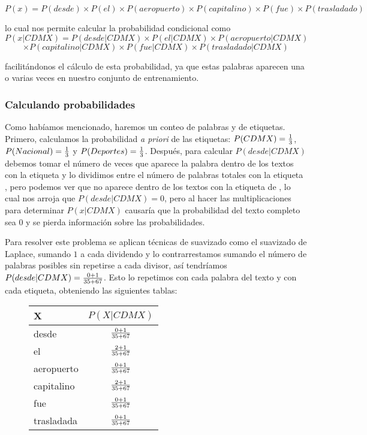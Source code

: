 \[ P(x) = P(desde) \times P(el) \times P(aeropuerto) \times P(capitalino) \times P(fue) \times P(trasladado) \]

lo cual nos permite calcular la probabilidad condicional como
\[ P(x | CDMX) = P(desde|CDMX) \times P(el|CDMX) \times P(aeropuerto|CDMX) \]
\[ \times P(capitalino|CDMX) \times P(fue|CDMX) \times P(trasladado|CDMX) \]

facilitándonos el cálculo de esta probabilidad, ya que estas palabras aparecen una o varias veces en nuestro conjunto de entrenamiento.

\subsubsection{Calculando probabilidades}

Como habíamos mencionado, haremos un conteo de palabras y de etiquetas. Primero, calculamos la probabilidad \textit{a priori} de las etiquetas: \(P(CDMX) = {1 \over 3}\), \(P(Nacional) = {1 \over 3}\) y \(P(Deportes) = {1 \over 3}\). Después, para calcular \(P(desde|CDMX)\) debemos tomar el número de veces que aparece la palabra  dentro de los textos con la etiqueta  y lo dividimos entre el número de palabras totales con la etiqueta , pero podemos ver que  no aparece dentro de los textos con la etiqueta de , lo cual nos arroja que \(P(desde|CDMX) = 0\), pero al hacer las multiplicaciones para determinar \(P(x| CDMX)\) causaría que la probabilidad del texto completo sea $0$ y se pierda información sobre las probabilidades.

Para resolver este problema se aplican técnicas de suavizado \parencite[ver][202]{ManningSchutze1999} como el suavizado de Laplace, sumando $1$ a cada dividendo y lo contrarrestamos sumando el número de palabras posibles sin repetirse a cada divisor, así tendríamos \(P(desde|CDMX) = {{0 + 1} \over {35 + 67} }\). Esto lo repetimos con cada palabra del texto  y con cada etiqueta, obteniendo las siguientes tablas:

\begin{figure}[H]
  \begin{center}
    \begin{tabular}{ l | c }
      X & $P(X|CDMX)$ \\ \hline
      desde & $0 + 1 \over {35 + 67}$ \\ \hline
      el & $2 + 1 \over {35 + 67}$ \\ \hline
      aeropuerto & $0 + 1 \over {35 + 67}$ \\ \hline
      capitalino & $2 + 1 \over {35 + 67}$ \\ \hline
      fue & $0 + 1 \over {35 + 67}$ \\ \hline
      trasladada & $0 + 1 \over {35 + 67}$ \\
    \end{tabular}
  \end{center}
\end{figure}


